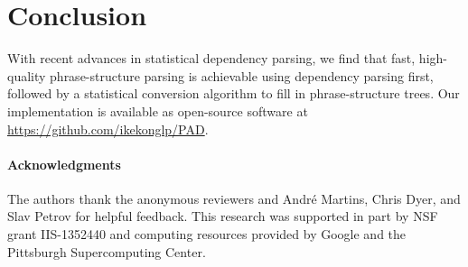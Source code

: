 \documentclass[11pt,letterpaper]{article}
\newcommand{\RuleA}[3]{#1 \rightarrow #2^*\ #3}
\newcommand{\RuleB}[3]{#1 \rightarrow #2\ #3^*}
\newcommand{\ParserUrl}{\url{https://github.com/ikekonglp/PAD}}
\newcommand{\nascomment}[1]{\textcolor{blue}{\bf \small [#1 --nas]}}
\begin{document}



\section{Conclusion}

With recent advances in statistical dependency parsing, we find that
fast, high-quality phrase-structure parsing is achievable using dependency
parsing first, followed by a statistical conversion algorithm to
fill in phrase-structure trees. 
Our implementation is available as open-source software at \ParserUrl.

\paragraph{Acknowledgments}
The authors thank the anonymous reviewers
and Andr\'{e} Martins, Chris Dyer, and Slav Petrov 
for helpful feedback.
This research was supported in part by NSF grant IIS-1352440 and computing resources provided by Google and the Pittsburgh Supercomputing Center.











\end{document}
